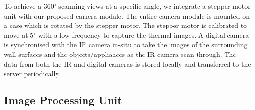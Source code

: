 	
To achieve a 360$^{\circ}$ scanning views at a specific angle, we integrate a stepper motor unit with our proposed camera module. The entire camera module is mounted on a case which is rotated by the stepper motor. The stepper motor is calibrated to move at 5$^{\circ}$ with a low frequency to capture the thermal images. A digital camera is synchronised with the IR camera in-situ to take the images of the surrounding wall surfaces and the objects/appliances as the IR camera scan through. The data from both the IR and digital cameras is stored locally and transferred to the server periodically.
	
\subsection{Image Processing Unit}
\label{sec:imageprocessing}




%
%

